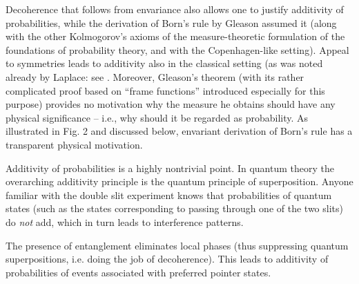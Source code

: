 \documentclass[aps,amsmath,amssymb,amsfonts,floatfix]{revtex4-1}
\newcommand{\+}         {\dagger}
\begin{document}
{%
Decoherence that follows from envariance also allows one to justify additivity of probabilities, while the derivation of Born's rule 
by Gleason \cite{Gleason} assumed it (along with the other Kolmogorov's axioms of the measure-theoretic formulation of the foundations of probability theory, and with the Copenhagen-like setting). 
Appeal to symmetries leads to additivity also in the classical setting (as was noted already by Laplace: see \cite{40,32}. Moreover,
Gleason's theorem (with its rather complicated proof based on ``frame functions'' introduced especially for this purpose) provides no motivation why the measure he obtains should have any
physical significance -- i.e., why should it be regarded as probability. As illustrated in Fig. 2 and discussed below,
envariant derivation of Born's rule has a transparent physical motivation.

Additivity of probabilities is a highly nontrivial point. In quantum theory the overarching
additivity principle is the quantum principle of superposition. Anyone familiar with the double slit
experiment knows that probabilities of quantum states (such as the states corresponding to passing
through one of the two slits) do {\it not} add, which in turn leads to interference patterns. 

The presence of entanglement eliminates
local phases (thus suppressing quantum superpositions, i.e. doing the job of decoherence). This leads to additivity of probabilities of  events associated with preferred pointer states. 

}
\end{document}
